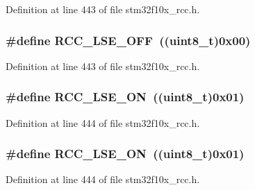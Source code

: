 Definition at line 443 of file stm32f10x\+\_\+rcc.\+h.

\subsubsection[{\texorpdfstring{R\+C\+C\+\_\+\+L\+S\+E\+\_\+\+O\+FF}{RCC_LSE_OFF}}]{\setlength{\rightskip}{0pt plus 5cm}\#define R\+C\+C\+\_\+\+L\+S\+E\+\_\+\+O\+FF~(({\bf uint8\+\_\+t})0x00)}\hypertarget{group___l_s_e__configuration_ga6645c27708d0cad1a4ab61d2abb24c77}{}\label{group___l_s_e__configuration_ga6645c27708d0cad1a4ab61d2abb24c77}


Definition at line 443 of file stm32f10x\+\_\+rcc.\+h.

\subsubsection[{\texorpdfstring{R\+C\+C\+\_\+\+L\+S\+E\+\_\+\+ON}{RCC_LSE_ON}}]{\setlength{\rightskip}{0pt plus 5cm}\#define R\+C\+C\+\_\+\+L\+S\+E\+\_\+\+ON~(({\bf uint8\+\_\+t})0x01)}\hypertarget{group___l_s_e__configuration_gac981ea636c2f215e4473901e0912f55a}{}\label{group___l_s_e__configuration_gac981ea636c2f215e4473901e0912f55a}


Definition at line 444 of file stm32f10x\+\_\+rcc.\+h.

\subsubsection[{\texorpdfstring{R\+C\+C\+\_\+\+L\+S\+E\+\_\+\+ON}{RCC_LSE_ON}}]{\setlength{\rightskip}{0pt plus 5cm}\#define R\+C\+C\+\_\+\+L\+S\+E\+\_\+\+ON~(({\bf uint8\+\_\+t})0x01)}\hypertarget{group___l_s_e__configuration_gac981ea636c2f215e4473901e0912f55a}{}\label{group___l_s_e__configuration_gac981ea636c2f215e4473901e0912f55a}


Definition at line 444 of file stm32f10x\+\_\+rcc.\+h.

